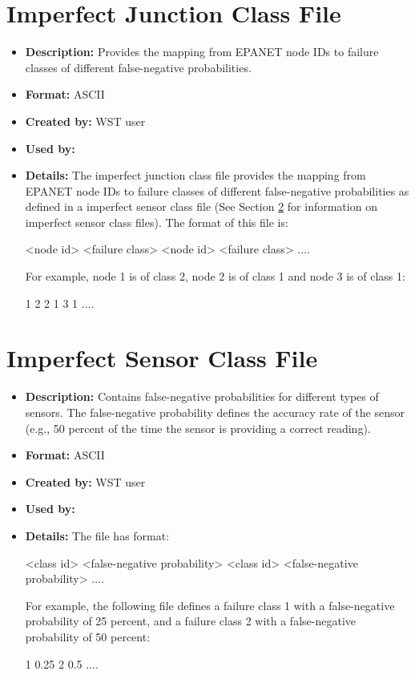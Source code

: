 \section{Imperfect Junction Class File}\label{formats_junctionClass}
\begin{itemize}
\item {\bfseries Description:} Provides the mapping from EPANET node IDs to failure classes of different false-negative probabilities. 
\item {\bfseries Format:} ASCII 
\item {\bfseries Created by:} WST user 
\item {\bfseries Used by:}  
\item {\bfseries Details:} The imperfect junction class file provides the mapping from EPANET node IDs
 to failure classes of different false-negative probabilities as defined in a imperfect sensor class file 
 (See Section \ref{formats_sensorClass} for information on imperfect sensor class files). The format of this file is:
\begin{unknownListing}
   <node id> <failure class>
   <node id> <failure class>
   ....
\end{unknownListing}

For example, node 1 is of class 2, node 2 is of class 1 and node 3 is of class 1:
\begin{unknownListing}
   1 2
   2 1
   3 1
   ....
\end{unknownListing}
\end{itemize}

\section{Imperfect Sensor Class File}\label{formats_sensorClass}
\begin{itemize}
\item {\bfseries Description:} Contains false-negative probabilities for different types of sensors. 
The false-negative probability defines the accuracy rate of the sensor (e.g., 50 percent of the 
time the sensor is providing a correct reading). 
\item {\bfseries Format:} ASCII 
\item {\bfseries Created by:} WST user 
\item {\bfseries Used by:}  
\item {\bfseries Details:} The file has format:
\begin{unknownListing}
   <class id> <false-negative probability>
   <class id> <false-negative probability>
   ....
\end{unknownListing}

For example, the following file defines a failure class 1 with a false-negative probability of 25 percent, 
and a failure class 2 with a false-negative probability of 50 percent:
\begin{unknownListing}
   1 0.25
   2 0.5
   ....
\end{unknownListing}
\end{itemize}

